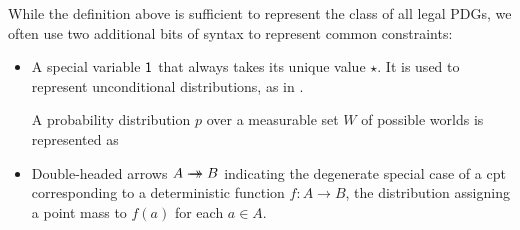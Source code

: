 \documentclass{article}
\newcommand{\doubleheadrightarrow}{%
	\rightarrow\mathrel{\mspace{-15mu}}\rightarrow}
\newcommand{\MN}{PDG}
\newcommand{\MNs}{\MN s}
\numberwithin{equation}{section}
\begin{document}
	While the definition above is sufficient to represent the
        class of all legal \MNs,
	we often use two additional bits of syntax to represent
        common constraints:  
	\begin{itemize}
		\item A special variable $\sf 1$ that always takes its unique value $\star$. It is used to represent unconditional distributions, as in . 
		  \begin{vfull}
		\begin{examplex}\label{ex:worldsonly}
			A probability distribution $p$ over a measurable set $W$ of possible worlds is represented as 
			\begin{center}
			\end{center}
		\end{examplex}
		\end{vfull}
		\item Double-headed arrows $A \doubleheadrightarrow B$ indicating the degenerate special case of a cpt corresponding to a deterministic function $f : A \to B$, the distribution assigning a point mass to $f(a)$ for each $a \in A$.
	\end{itemize}
\end{document}
